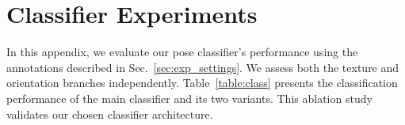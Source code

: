 \section{Classifier Experiments}\label{app:cls_exps}


In this appendix, we evaluate our pose classifier's performance using the annotations described in Sec.~\ref{sec:exp_settings}. We assess both the texture and orientation branches independently. Table~\ref{table:class} presents the classification performance of the main classifier and its two variants. This ablation study validates our chosen classifier architecture.